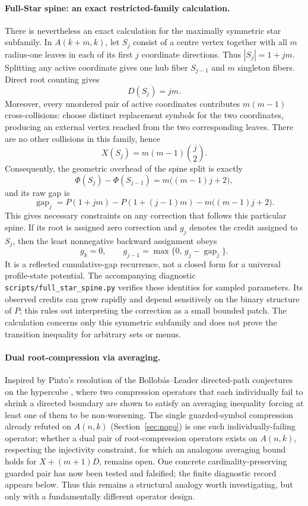 \paragraph{Full-Star spine: an exact restricted-family calculation.}
There is nevertheless an exact calculation for the maximally symmetric star
subfamily. In $A(k+m,k)$, let $S_j$ consist of a centre vertex together with
all $m$ radius-one leaves in each of its first $j$ coordinate directions. Thus
$|S_j|=1+jm$. Splitting any active coordinate gives one hub fiber $S_{j-1}$
and $m$ singleton fibers. Direct root counting gives
\[
 D(S_j)=jm.
\]
Moreover, every unordered pair of active coordinates contributes
$m(m-1)$ cross-collisions: choose distinct replacement symbols for the two
coordinates, producing an external vertex reached from the two corresponding
leaves. There are no other collisions in this family, hence
\[
 X(S_j)=m(m-1)\binom{j}{2}.
\]
Consequently, the geometric overhead of the spine split is exactly
\[
 \Phi(S_j)-\Phi(S_{j-1})=m\bigl((m-1)j+2\bigr),
\]
and its raw gap is
\[
 \operatorname{gap}_j=P(1+jm)-P(1+(j-1)m)
                    -m\bigl((m-1)j+2\bigr).
\]
This gives necessary constraints on any correction that follows this particular
spine. If its root is assigned zero correction and $g_j$ denotes the credit
assigned to $S_j$, then the least nonnegative backward assignment obeys
\[
 g_k=0,\qquad g_{j-1}=\max\{0,\,g_j-\operatorname{gap}_j\}.
\]
It is a reflected cumulative-gap recurrence, not a closed form for a universal
profile-state potential. The accompanying diagnostic
\texttt{scripts/full\_star\_spine.py} verifies these identities for sampled
parameters. Its observed credits can grow rapidly and depend sensitively on
the binary structure of $P$; this rules out interpreting the correction as a
small bounded patch. The calculation concerns only this symmetric subfamily
and does not prove the transition inequality for arbitrary sets or menus.

\paragraph{Dual root-compression via averaging.}
Inspired by Pinto's resolution of the Bollob\'{a}s--Leader directed-path
conjectures on the hypercube \cite{pinto2015directed}, where two
compression operators that each individually fail to shrink a directed
boundary are shown to satisfy an averaging inequality forcing at least
one of them to be non-worsening. The single guarded-symbol compression
already refuted on $A(n,k)$ (Section~\ref{sec:nogo}) is one such
individually-failing operator; whether a dual pair of root-compression
operators exists on $A(n,k)$, respecting the injectivity constraint, for
which an analogous averaging bound holds for $X+(m+1)D$, remains open. One
concrete cardinality-preserving guarded pair has now been tested and
falsified; the finite diagnostic record appears below. Thus this remains a
structural analogy worth investigating, but only with a fundamentally
different operator design.

